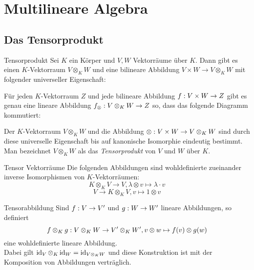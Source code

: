\documentclass[main.tex]{subfiles}
\begin{document}
\section*{Multilineare Algebra}
\subsection*{Das Tensorprodukt}

\begin{karte}{Tensorprodukt}
    Sei \( K \) ein Körper und \( V,W \) Vektorräume über 
    \( K \). Dann gibt es einen \(K\)-Vektorraum \( V \otimes_K W \) 
    und eine bilineare Abbildung \( V \times W \rightarrow V\otimes_K W \) 
    mit folgender universeller Eigenschaft:

    Für jeden \( K \)-Vektorraum \( Z \) und jede bilineare Abbildung 
    \( f : V\times W \rightarrow Z \) gibt es genau eine lineare Abbildung 
    \( f_\otimes : V\otimes_K W \rightarrow Z \) so, dass das folgende Diagramm kommutiert:
    \begin{center}
    \end{center}
    Der \( K \)-Vektorraum \( V \otimes_K W \) und die 
    Abbildung \( \otimes : V\times W \rightarrow V \otimes_K W \) 
    sind durch diese universelle Eigenschaft bis auf 
    kanonische Isomorphie eindeutig bestimmt. Man 
    bezeichnet \( V \otimes_K W \) als das \textit{Tensorprodukt} 
    von \( V \) und \(W\) über \(K\).
\end{karte}

\begin{karte}{Tensor Vektorräume}
    Die folgenden Abbildungen sind wohldefinierte zueinander inverse 
    Isomorphismen von \(K\)-Vektorräumen:
    \[ K\otimes_K V \rightarrow V, \lambda \otimes v \mapsto \lambda \cdot v \]
    \[ V \rightarrow K \otimes_K V, v \mapsto 1 \otimes v \]
\end{karte}

\begin{karte}{Tensorabbildung}
    Sind \( f : V \rightarrow V' \) und \( g : W \rightarrow W' \) 
    lineare Abbildungen, so definiert 
    \[  f \otimes_K g  : V \otimes_K W \rightarrow V' \otimes_K W', 
    v \otimes w \mapsto f(v) \otimes g(w) \]
    eine wohldefinierte lineare Abbildung.\\
    Dabei gilt \( \operatorname{id}_V \otimes_K \operatorname{id}_W = \operatorname{id}_{V \otimes_K W} \) 
    und diese Konstruktion ist mit der Komposition von Abbildungen 
    verträglich.
\end{karte}
\end{document}
